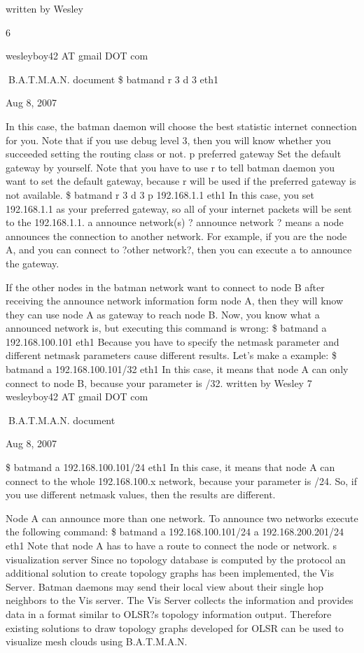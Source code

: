 \documentclass[
	12pt,
	a4paper,
	twoside,
	english,
	headsepline,
	footnosepline,
	automark,
	normalheadings,
	openany,
	cleardoubleplain,
	abstracton,
	idxtotoc,
	liststotoc,
	bibtotoc,
 	BCOR8mm,
]{scrartcl}
\begin{document}
written by Wesley

6

wesleyboy42 AT gmail DOT com

B.A.T.M.A.N. document \$ batmand  r 3  d 3  eth1

Aug 8, 2007

In this case, the batman daemon will choose the best statistic internet connection for you. Note that if you use debug level 3, then you will know whether you succeeded setting the  routing class or not.  p preferred gateway Set the default gateway  by yourself. Note that you have to use  r to tell batman daemon you want to set the default gateway,  because  r will be used if the preferred gateway is not available. \$ batmand  r 3  d 3  p 192.168.1.1 eth1 In this case, you set 192.168.1.1 as your preferred gateway, so all of your internet packets will  be sent to the 192.168.1.1.  a announce network(s) ? announce network ? means a node announces the connection to another network. For example, if you are the node A, and you can connect to ?other network?, then you can  execute  a to announce the gateway.

If the other nodes in the batman network want to connect to node B after receiving the  announce network information form node A, then they will know they can use node A as  gateway to reach node B. Now, you know what a announced network is, but executing this command is wrong: \$ batmand   a 192.168.100.101  eth1  Because you have to specify the netmask parameter and different netmask parameters cause  different results. Let's make a example: \$ batmand   a 192.168.100.101/32  eth1 In this case, it means that node A can only connect to node B, because your parameter is /32. written by Wesley 7 wesleyboy42 AT gmail DOT com

B.A.T.M.A.N. document

Aug 8, 2007

\$ batmand   a 192.168.100.101/24  eth1 In this case, it means that node A can connect to the whole 192.168.100.x network, because  your parameter is /24. So, if you use different netmask values, then the results are different.

Node A can  announce more than one network. To announce two networks execute the following  command: \$ batmand   a 192.168.100.101/24   a 192.168.200.201/24 eth1  Note that node A has to have a route to connect the node or network.  s visualization server Since no topology database is computed by the protocol an additional solution to create  topology graphs has been implemented, the Vis Server. Batman daemons may send their  local view about their single hop neighbors to the Vis server. The Vis Server collects the  information and provides data in a format similar to OLSR?s topology information output.  Therefore existing solutions to draw topology graphs developed for OLSR can be used to  visualize mesh clouds using B.A.T.M.A.N.
\end{document}
